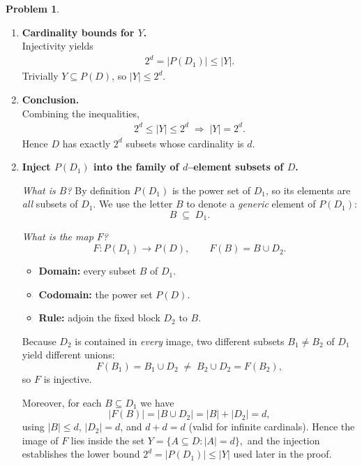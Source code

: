 \documentclass[12pt]{article}
\theoremstyle{definition} %
\newtheorem{problem}{Problem}
\theoremstyle{plain} %
\begin{document}
\begin{problem}
\begin{enumerate}
        \item \textbf{Cardinality bounds for $Y$.}\\
              Injectivity yields
              \begin{align}
                  2^{d}=|P(D_1)|\le |Y|.
              \end{align}
              Trivially $Y\subseteq P(D)$, so $|Y|\le 2^{d}$.

        \item \textbf{Conclusion.}\\
              Combining the inequalities,
              \begin{align}
                  2^{d}\le |Y|\le 2^{d}\;\Longrightarrow\;|Y|=2^{d}.
              \end{align}
              Hence $D$ has exactly $2^{d}$ subsets whose cardinality is $d$.
              \qedhere
    \end{enumerate}
\end{problem}
\begin{enumerate}
    \setcounter{enumi}{1}  %
    \item \textbf{Inject $P(D_1)$ into the family of $d$–element subsets of $D$.}

          \medskip\noindent
          \emph{What is $B$?}\;
          By definition $P(D_1)$ is the power set of $D_1$, so its elements
          are \emph{all} subsets of $D_1$.  We use the letter
          $B$ to denote a \emph{generic} element of $P(D_1)$:
          \[
              B\;\subseteq\;D_1.
          \]

          \medskip\noindent
          \emph{What is the map $F$?}\;
          \[
              F : P(D_1)\longrightarrow P(D),
              \qquad
              F(B)=B\cup D_2.
          \]
          \begin{itemize}
              \item \textbf{Domain:} every subset $B$ of $D_1$.
              \item \textbf{Codomain:} the power set $P(D)$.
              \item \textbf{Rule:} adjoin the fixed block $D_2$ to $B$.
          \end{itemize}

          Because $D_2$ is contained in \emph{every} image, two different
          subsets $B_1\neq B_2$ of $D_1$ yield different unions:
          \[
              F(B_1)=B_1\cup D_2\;\neq\;B_2\cup D_2=F(B_2),
          \]
          so $F$ is injective.

          Moreover, for each $B\subseteq D_1$ we have
          \[
              |F(B)|=|B\cup D_2|=|B|+|D_2|=d,
          \]
          using $|B|\le d$, $|D_2|=d$, and $d+d=d$ (valid for infinite
          cardinals).  Hence the image of $F$ lies inside the set
          \(
              Y=\{A\subseteq D:|A|=d\},
          \)
          and the injection establishes the lower bound
          $2^{d}=|P(D_1)|\le |Y|$ used later in the proof.
\end{enumerate}
\end{document}
